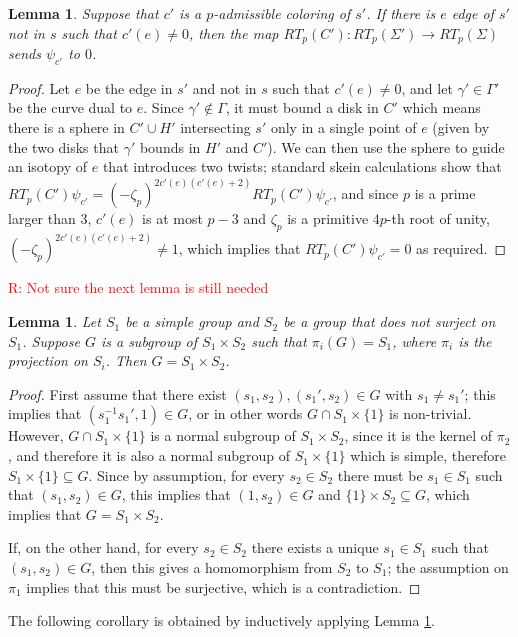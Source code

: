 \documentclass[12pt]{amsart}
\newtheorem{lem}[thm]{Lemma}
\theoremstyle{definition}
\newcommand{\ra}{\rightarrow}
\newcommand{\C}{\mathbb{C}}
\begin{document}
\begin{lem}
	Suppose that $c'$ is a $p$-admissible coloring of $s'$. If there is $e$ edge of $s'$ not in $s$ such that $c'(e)\neq 0$, then the map $RT_p(C'):RT_p(\Sigma')\ra RT_p(\Sigma)$ sends $\psi_{c'}$ to $0$. %
\end{lem}
\begin{proof}
	Let $e$ be the edge in $s'$ and not in $s$ such that $c'(e)\neq 0$, and let $\gamma'\in \Gamma'$ be the curve dual to $e$. Since $\gamma'\notin \Gamma$, it must bound a disk in $C'$ which means there is a sphere in $C'\cup H'$ intersecting $s'$ only in a single point of $e$ (given by the two disks that $\gamma'$ bounds in $H'$ and $C'$). We can then use the sphere to guide an isotopy of $e$ that introduces two twists; standard skein calculations show that $RT_p(C')\psi_{c'}=(-\zeta_p)^{2c'(e)(c'(e)+2)}RT_p(C')\psi_{c'}$, and since $p$ is a prime larger than $3$, $c'(e)$ is at most $p-3$ and $\zeta_p$ is a primitive $4p$-th root of unity, $(-\zeta_p)^{2c'(e)(c'(e)+2)}\neq 1$, which implies that $RT_p(C')\psi_{c'}=0$ as required.
\end{proof}
\textcolor{red}{R: Not sure the next lemma is still needed}
\begin{lem}\label{lem:product}
	Let $S_1$ be a simple group and $S_2$ be a group that does not surject on $S_1$. Suppose $G$ is a subgroup of $S_1\times S_2$ such that $\pi_i(G)=S_1$, where $\pi_i$ is the projection on $S_i$. Then $G=S_1\times S_2$.
\end{lem}
\begin{proof}
	First assume that there exist $(s_1,s_2),(s_1',s_2)\in G$ with $s_1\neq s_1'$; this implies that $(s_1^{-1}s_1',1)\in G$, or in other words $G\cap S_1\times \{1\}$ is non-trivial. However, $G\cap S_1\times \{1\}$ is a normal subgroup of $S_1\times S_2$, since it is the kernel of $\pi_2$, and therefore it is also a normal subgroup of $S_1\times \{1\}$ which is simple, therefore $S_1\times \{1\}\subseteq G$. Since by assumption, for every $s_2\in S_2$ there must be $s_1\in S_1$ such that $(s_1,s_2)\in G$, this implies that $(1,s_2)\in G$ and $\{1\}\times S_2\subseteq G$, which implies that $G=S_1\times S_2$.
	
	If, on the other hand, for every $s_2\in S_2$ there exists a unique $s_1\in S_1$ such that $(s_1,s_2)\in G$, then this gives a homomorphism from $S_2$ to $S_1$; the assumption on $\pi_1$ implies that this must be surjective, which is a contradiction.
\end{proof}
The following corollary is obtained by inductively applying Lemma \ref{lem:product}.
\end{document}
